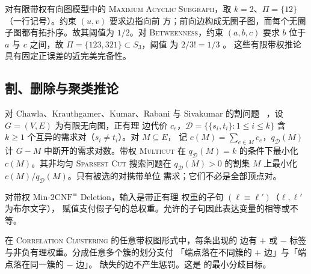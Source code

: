 对有限带权有向图模型中的 \textsc{Maximum Acyclic Subgraph}，取
\(k=2\)、\(\Pi=\{12\}\)（一行记号）。约束 \((u,v)\) 要求边指向前
方；前向边构成无圈子图，而每个无圈子图都有拓扑序。故其阈值为
\(1/2\)。对 \textsc{Betweenness}，约束 \((a,b,c)\) 要求 \(b\)
位于 \(a\) 与 \(c\) 之间，故 \(\Pi=\{123,321\}\subset S_3\)，阈值
为 \(2/3!=1/3\)
\cite[Theorem~1.1 and Section~1.2]{GuruswamiEtAl2011OrderingCSP}。
这些有限带权推论具有固定正误差的近完美完备性。

\subsection{割、删除与聚类推论}

对 Chawla、Krauthgamer、Kumar、Rabani 与 Sivakumar 的割问题
~\cite[Section~1]{CKKRS2006}，设 \(G=(V,E)\) 为有限无向图，正有理
边代价 \(c_e\)，\(\mathcal D=\{\{s_i,t_i\}:1\le i\le k\}\) 含
\(k\ge1\) 个互异的需求对（\(s_i\ne t_i\)）。对 \(M\subseteq E\)，
记 \(c(M)=\sum_{e\in M}c_e\)，\(q_{\mathcal D}(M)\) 计
\(G-M\) 中断开的需求对数。带权 \textsc{Multicut} 在
\(q_{\mathcal D}(M)=k\) 的条件下最小化 \(c(M)\)。其非均匀
\textsc{Sparsest Cut} 搜索问题在 \(q_{\mathcal D}(M)>0\) 的割集
\(M\) 上最小化 \(c(M)/q_{\mathcal D}(M)\)。只有被选的对携带单位
需求；它们不必是全部顶点对。

对带权 Min-\(2\mathrm{CNF}^{\equiv}\) Deletion，输入是带正有理
权重的子句 \((\ell\equiv\ell')\)（\(\ell,\ell'\) 为布尔文字），
赋值支付假子句的总权重。允许的子句因此表达变量的相等或不等。

在 \textsc{Correlation Clustering} 的任意带权图形式中，每条出现的
边有 \(+\) 或 \(-\) 标签与非负有理权重。分成任意多个簇的划分支付
「端点落在不同簇的 \(+\) 边」与「端点落在同一簇的 \(-\) 边」。
缺失的边不产生惩罚。这是 \cite[Section~2.1]{DemaineEtAl2006Clustering}
的最小分歧目标。

